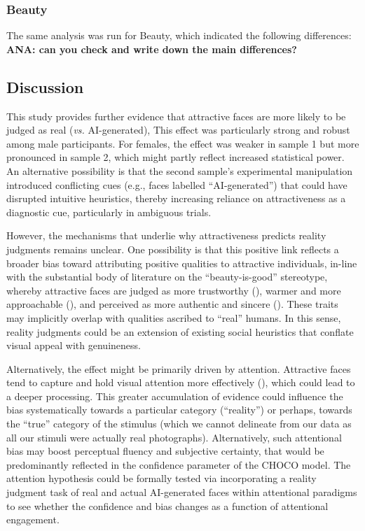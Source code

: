 \documentclass[
  jou,
  floatsintext,
  longtable,
  nolmodern,
  notxfonts,
  notimes,
  colorlinks=true,linkcolor=blue,citecolor=blue,urlcolor=blue]{apa7}
\begin{document}
\subsubsection{Beauty}\label{beauty}

The same analysis was run for Beauty, which indicated the following
differences: \textbf{ANA: can you check and write down the main
differences?}

\subsection{Discussion}\label{discussion-1}

This study provides further evidence that attractive faces are more
likely to be judged as real (\emph{vs.} AI-generated), This effect was
particularly strong and robust among male participants. For females, the
effect was weaker in sample 1 but more pronounced in sample 2, which
might partly reflect increased statistical power. An alternative
possibility is that the second sample's experimental manipulation
introduced conflicting cues (e.g., faces labelled ``AI-generated'') that
could have disrupted intuitive heuristics, thereby increasing reliance
on attractiveness as a diagnostic cue, particularly in ambiguous trials.

However, the mechanisms that underlie why attractiveness predicts
reality judgments remains unclear. One possibility is that this positive
link reflects a broader bias toward attributing positive qualities to
attractive individuals, in-line with the substantial body of literature
on the ``beauty-is-good'' stereotype, whereby attractive faces are
judged as more trustworthy (), warmer and more approachable
(), and perceived as
more authentic and sincere (). These traits may implicitly overlap with qualities ascribed to
``real'' humans. In this sense, reality judgments could be an extension
of existing social heuristics that conflate visual appeal with
genuineness.

Alternatively, the effect might be primarily driven by attention.
Attractive faces tend to capture and hold visual attention more
effectively (), which could lead to a deeper processing. This greater
accumulation of evidence could influence the bias systematically towards
a particular category (``reality'') or perhaps, towards the ``true''
category of the stimulus (which we cannot delineate from our data as all
our stimuli were actually real photographs). Alternatively, such
attentional bias may boost perceptual fluency and subjective certainty,
that would be predominantly reflected in the confidence parameter of the
CHOCO model. The attention hypothesis could be formally tested via
incorporating a reality judgment task of real and actual AI-generated
faces within attentional paradigms to see whether the confidence and
bias changes as a function of attentional engagement.
\end{document}
